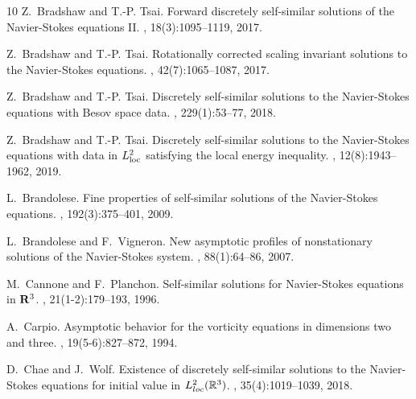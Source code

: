 \documentclass[12pt]{amsart}
\numberwithin{equation}{section}              %
\theoremstyle{remark}
\begin{document}
\begin{thebibliography}{10}
      	Z.~Bradshaw and T.-P. Tsai.
      	\newblock Forward discretely self-similar solutions of the {N}avier-{S}tokes
      	equations {II}.
      	, 18(3):1095--1119, 2017.
      	
      	Z.~Bradshaw and T.-P. Tsai.
      	\newblock Rotationally corrected scaling invariant solutions to the
      	{N}avier-{S}tokes equations.
      	, 42(7):1065--1087, 2017.
      	
      	Z.~Bradshaw and T.-P. Tsai.
      	\newblock Discretely self-similar solutions to the {N}avier-{S}tokes equations
      	with {B}esov space data.
      	, 229(1):53--77, 2018.
      	
      	Z.~Bradshaw and T.-P. Tsai.
      	\newblock Discretely self-similar solutions to the {N}avier-{S}tokes equations
      	with data in {$L_{\rm loc}^2$} satisfying the local energy inequality.
      	, 12(8):1943--1962, 2019.
      	
      	L.~Brandolese.
      	\newblock Fine properties of self-similar solutions of the {N}avier-{S}tokes
      	equations.
      	, 192(3):375--401, 2009.
      	
      	L.~Brandolese and F.~Vigneron.
      	\newblock New asymptotic profiles of nonstationary solutions of the
      	{N}avier-{S}tokes system.
      	, 88(1):64--86, 2007.
      	
      	M.~Cannone and F.~Planchon.
      	\newblock Self-similar solutions for {N}avier-{S}tokes equations in {${\bf
      			R}^3$}.
      	, 21(1-2):179--193, 1996.
      	
      	A.~Carpio.
      	\newblock Asymptotic behavior for the vorticity equations in dimensions two and
      	three.
      	, 19(5-6):827--872, 1994.
      	
      	D.~Chae and J.~Wolf.
      	\newblock Existence of discretely self-similar solutions to the
      	{N}avier-{S}tokes equations for initial value in {$L_{loc}^2(\Bbb R^3)$}.
      	,
      	35(4):1019--1039, 2018.
      	

\end{thebibliography}
\end{document}
